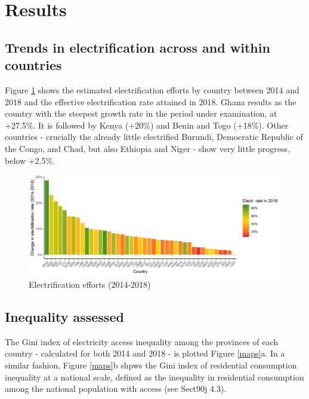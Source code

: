 \documentclass[preprint,12pt]{elsarticle}
\begin{document}
\section{Results}
\subsection{Trends in electrification across and within countries}
Figure \ref{barplot} shows the estimated electrification efforts by country between 2014 and 2018 and the effective electrification rate attained in 2018. Ghana results as the country with the steepest growth rate in the period under examination, at +27.5\%. It is followed by Kenya (+20\%) and Benin and Togo (+18\%). Other countries - crucially the already little electrified Burundi, Democratic Republic of the Congo, and Chad, but also Ethiopia and Niger - show very little progress, below +2.5\%.

\begin{figure}[H]
    \centering
    \includegraphics[scale=0.7]{figures/barplot.png}
    \caption{Electrification efforts (2014-2018)}
    \label{barplot}
\end{figure}

\subsection{Inequality assessed}
The Gini index of electricity access inequality among the provinces of each country - calculated for both 2014 and 2018 - is plotted Figure \ref{maps}a.  In a similar fashion, Figure \ref{maps}b shpws the Gini index of residential consumption inequality at a national scale, defined as the inequality in residential consumption among the national population with access (see Sect90j 4.3). 
\end{document}
